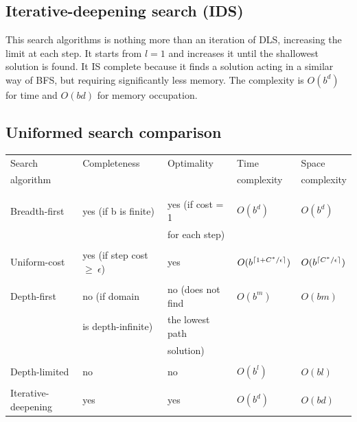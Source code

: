 \documentclass{article}
\DeclarePairedDelimiter\ceil{\lceil}{\rceil}
\begin{document}
\subsection{Iterative-deepening search (IDS)}

This search algorithms is nothing more than an iteration of DLS, increasing the limit at each step. It starts from $l=1$ and increases it until the shallowest solution is found. It IS complete because it finds a solution acting in a similar way of BFS, but requiring significantly less memory. The complexity is $O(b^d)$ for time and $O(bd)$ for memory occupation. 

\newpage

\subsection{Uniformed search comparison}

\begin{center}
    \begin{table}[h]
        \begin{tabular}{l | l | l | l | l}
            Search & Completeness & Optimality & Time & Space \\
            algorithm & & & complexity & complexity \\
            & & & & \\
            \hline
            & & & & \\
            Breadth-first & yes (if b is finite) & yes (if cost = 1 & $O(b^d)$ & $O(b^d)$ \\
            & & for each step) & & \\
            & & & & \\
            Uniform-cost & yes (if step cost $\geq\ \epsilon$) & yes & $O(b^{\ceil{1 + C^*/\epsilon}})$ & $O(b^{\ceil{C^*/\epsilon}})$ \\
            & & & & \\
            Depth-first & no (if domain & no (does not find& $O(b^m)$ & $O(bm)$ \\
            & is depth-infinite) & the lowest path& & \\
            & & solution) & & \\
            & & & & \\
            Depth-limited & no & no & $O(b^l)$ & $O(bl)$ \\
            & & & & \\
            Iterative-deepening & yes & yes & $O(b^d)$ & $O(bd)$
        \end{tabular}
    \end{table}
\end{center}
\end{document}
